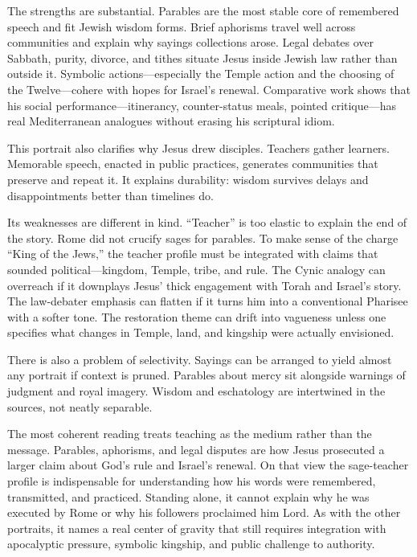 The strengths are substantial.
Parables are the most stable core of remembered speech and fit Jewish wisdom forms.
Brief aphorisms travel well across communities and explain why sayings collections arose.
Legal debates over Sabbath, purity, divorce, and tithes situate Jesus inside Jewish law rather than outside it.
Symbolic actions---especially the Temple action and the choosing of the Twelve---cohere with hopes for Israel’s renewal.
Comparative work shows that his social performance---itinerancy, counter-status meals, pointed critique---has real Mediterranean analogues without erasing his scriptural idiom.

This portrait also clarifies why Jesus drew disciples.
Teachers gather learners.
Memorable speech, enacted in public practices, generates communities that preserve and repeat it.
It explains durability: wisdom survives delays and disappointments better than timelines do.

Its weaknesses are different in kind.
“Teacher” is too elastic to explain the end of the story.
Rome did not crucify sages for parables.
To make sense of the charge “King of the Jews,” the teacher profile must be integrated with claims that sounded political---kingdom, Temple, tribe, and rule.
The Cynic analogy can overreach if it downplays Jesus’ thick engagement with Torah and Israel’s story.
The law-debater emphasis can flatten if it turns him into a conventional Pharisee with a softer tone.
The restoration theme can drift into vagueness unless one specifies what changes in Temple, land, and kingship were actually envisioned.

There is also a problem of selectivity.
Sayings can be arranged to yield almost any portrait if context is pruned.
Parables about mercy sit alongside warnings of judgment and royal imagery.
Wisdom and eschatology are intertwined in the sources, not neatly separable.

The most coherent reading treats teaching as the medium rather than the message.
Parables, aphorisms, and legal disputes are how Jesus prosecuted a larger claim about God’s rule and Israel’s renewal.
On that view the sage-teacher profile is indispensable for understanding how his words were remembered, transmitted, and practiced.
Standing alone, it cannot explain why he was executed by Rome or why his followers proclaimed him Lord.
As with the other portraits, it names a real center of gravity that still requires integration with apocalyptic pressure, symbolic kingship, and public challenge to authority.

